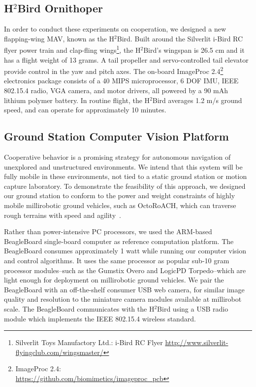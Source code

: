 \documentclass{aamas2013}
\begin{document}
\subsection{H$^2$Bird Ornithoper}
In order to conduct these experiments on cooperation, we designed a new
flapping-wing MAV, known as the H$^2$Bird. Built around the Silverlit i-Bird 
RC flyer power train and clap-fling 
wings\footnote{Silverlit Toys Manufactory Ltd.: i-Bird RC Flyer
\href{http://www.silverlit-flyingclub.com/wingsmaster/}
     {http://www.silverlit-flyingclub.com/wingsmaster/}}, 
the H$^2$Bird's wingspan is 26.5 cm and it has a flight weight of 13 grams. A 
tail propeller and servo-controlled tail elevator provide control in the yaw 
and pitch axes. The on-board ImageProc 2.4\footnote{ImageProc 2.4: \\
\href{https://github.com/biomimetics/imageproc\_pcb}
     {https://github.com/biomimetics/imageproc\_pcb}} 
electronics package consists of a 40 MIPS microprocessor, 6 DOF IMU, 
IEEE 802.15.4 radio, VGA camera, and motor drivers, all powered by a 90 mAh 
lithium polymer battery. In routine flight, the H$^2$Bird averages 1.2 m/s 
ground speed, and can operate for approximately 10 minutes.

\subsection{Ground Station Computer Vision Platform}
Cooperative behavior is a promising strategy for autonomous navigation of 
unexplored and unstructured environments. We intend that this system will be 
fully mobile in these environments, not tied to a static ground station or 
motion capture laboratory. To demonstrate the feasibility of this approach, 
we designed our ground station to conform to the power and weight 
constraints of highly mobile millirobotic ground vehicles, such as 
OctoRoACH, which can traverse rough terrains with speed and agility~\cite{Pullin2012Dynamic}. 

Rather than power-intensive PC processors, we used the ARM-based 
BeagleBoard single-board computer as reference computation platform. The
BeagleBoard consumes approximately 1 watt while running our computer vision 
and control algorithms. It uses the same processor as popular sub-10 gram 
processor modules--such as the Gumstix Overo and LogicPD Torpedo--which are 
light enough for deployment on millirobotic ground vehicles. We pair the 
BeagleBoard with an off-the-shelf consumer USB web camera, for similar image 
quality and resolution to the miniature camera modules available at 
millirobot scale. The BeagleBoard communicates with the H$^2$Bird using a 
USB radio module which implements the IEEE 802.15.4 wireless standard.
\end{document}
